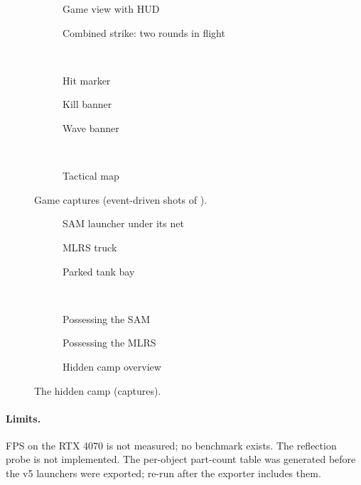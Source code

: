 \begin{figure}[h]
  \centering
  \begin{subfigure}{0.495\linewidth}\caption{Game view with HUD}\end{subfigure}
  \begin{subfigure}{0.495\linewidth}\caption{Combined strike: two rounds in flight}\end{subfigure}\\[1mm]
  \begin{subfigure}{0.325\linewidth}\caption{Hit marker}\end{subfigure}
  \begin{subfigure}{0.325\linewidth}\caption{Kill banner}\end{subfigure}
  \begin{subfigure}{0.325\linewidth}\caption{Wave banner}\end{subfigure}\\[1mm]
  \begin{subfigure}{0.6\linewidth}\caption{Tactical map}\end{subfigure}
  \caption{Game captures (event-driven shots of ).}\label{fig:v5game}
\end{figure}
\begin{figure}[h]
  \centering
  \begin{subfigure}{0.325\linewidth}\caption{SAM launcher under its net}\end{subfigure}
  \begin{subfigure}{0.325\linewidth}\caption{MLRS truck}\end{subfigure}
  \begin{subfigure}{0.325\linewidth}\caption{Parked tank bay}\end{subfigure}\\[1mm]
  \begin{subfigure}{0.325\linewidth}\caption{Possessing the SAM}\end{subfigure}
  \begin{subfigure}{0.325\linewidth}\caption{Possessing the MLRS}\end{subfigure}
  \begin{subfigure}{0.325\linewidth}\caption{Hidden camp overview}\end{subfigure}
  \caption{The hidden camp (captures).}\label{fig:v5camp}
\end{figure}

\paragraph{Limits.} FPS on the RTX 4070 is not measured; no benchmark exists. The reflection probe is not implemented. The per-object part-count table was generated before the v5 launchers were exported; re-run  after the exporter includes them.
